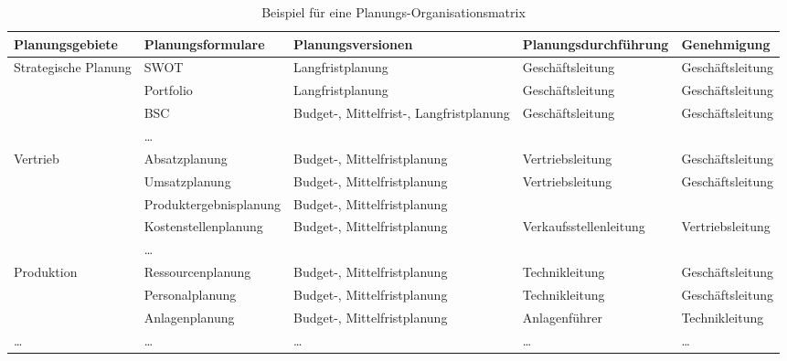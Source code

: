 \begin{table}[htbp]
  \centering
  \caption{Beispiel für eine Planungs-Organisationsmatrix}
  \label{tab:Beispiel_für_eine_Planungs-Organisationsmatrix}
  \footnotesize
  \begin{tabularx}{\textwidth}{@{}>{\raggedright\arraybackslash}p{1.6cm}>{\raggedright\arraybackslash}p{1.9cm}>{\raggedright\arraybackslash}X>{\raggedright\arraybackslash}p{1.8cm}>{\raggedright\arraybackslash}p{1.6cm}@{}}
    \toprule
    Planungs\-gebiete & Planungs\-formulare & Planungs\-versionen & Planungs\-durchführung & Geneh\-migung \\
    \midrule
    Strategische Planung & SWOT & Langfrist\-planung & Geschäfts\-leitung & Geschäfts\-leitung \\
     & Portfolio & Langfrist\-planung & Geschäfts\-leitung & Geschäfts\-leitung \\
     & BSC & Budget-, Mittelfrist-, Langfrist\-planung & Geschäfts\-leitung & Geschäfts\-leitung \\
     & \dots &  &  &  \\
    \addlinespace
    Vertrieb & Absatz\-planung & Budget-, Mittelfrist\-planung & Vertriebs\-leitung & Geschäfts\-leitung \\
     & Umsatz\-planung & Budget-, Mittelfrist\-planung & Vertriebs\-leitung & Geschäfts\-leitung \\
     & Produkt\-ergebnis\-planung & Budget-, Mittelfrist\-planung &  &  \\
     & Kosten\-stellen\-planung & Budget-, Mittelfrist\-planung & Verkaufs\-stellen\-leitung & Vertriebs\-leitung \\
     & \dots &  &  &  \\
    \addlinespace
    Produktion & Ressourcen\-planung & Budget-, Mittelfrist\-planung & Technik\-leitung & Geschäfts\-leitung \\
     & Personal\-planung & Budget-, Mittelfrist\-planung & Technik\-leitung & Geschäfts\-leitung \\
     & Anlagen\-planung & Budget-, Mittelfrist\-planung & Anlagen\-führer & Technik\-leitung \\
    \addlinespace
    \dots & \dots & \dots & \dots & \dots \\
    \bottomrule
  \end{tabularx}
\end{table}
